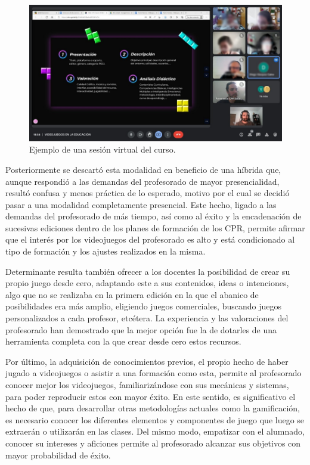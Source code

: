 \documentclass[spanish]{textolivre}
\begin{document}
\begin{figure}
    \centering
    \begin{minipage}{0.75\linewidth}
    \includegraphics[width=\linewidth]{Fig4.png}
    \caption{Ejemplo de una sesión virtual del curso.}
    \label{fig4}
    \end{minipage}
\end{figure}

Posteriormente se descartó esta modalidad en beneficio de una híbrida que, aunque respondió a las demandas del profesorado de mayor presencialidad, resultó confusa y menos práctica de lo esperado, motivo por el cual se decidió pasar a una modalidad completamente presencial. Este hecho, ligado a las demandas del profesorado de más tiempo, así como al éxito y la encadenación de sucesivas ediciones dentro de los planes de formación de los CPR, permite afirmar que el interés por los videojuegos del profesorado es alto y está condicionado al tipo de formación y los ajustes realizados en la misma.

Determinante resulta también ofrecer a los docentes la posibilidad de crear su propio juego desde cero, adaptando este a sus contenidos, ideas o intenciones, algo que no se realizaba en la primera edición en la que el abanico de posibilidades era más amplio, eligiendo juegos comerciales, buscando juegos personalizados a cada profesor, etcétera. La experiencia y las valoraciones del profesorado han demostrado que la mejor opción fue la de dotarles de una herramienta completa con la que crear desde cero estos recursos.

Por último, la adquisición de conocimientos previos, el propio hecho de haber jugado a videojuegos o asistir a una formación como esta, permite al profesorado conocer mejor los videojuegos, familiarizándose con sus mecánicas y sistemas, para poder reproducir estos con mayor éxito. En este sentido, es significativo el hecho de que, para desarrollar otras metodologías actuales como la gamificación, es necesario conocer los diferentes elementos y componentes de juego que luego se extraerán o utilizarán en las clases. Del mismo modo, empatizar con el alumnado, conocer su intereses y aficiones permite al profesorado alcanzar sus objetivos con mayor probabilidad de éxito.
\end{document}
